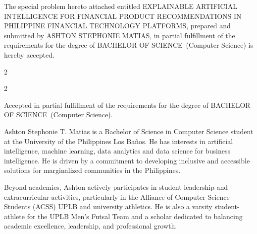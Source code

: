 \documentclass{icsthesis}
\renewcommand{\TITLE}{EXPLAINABLE ARTIFICIAL INTELLIGENCE FOR FINANCIAL PRODUCT RECOMMENDATIONS IN PHILIPPINE FINANCIAL TECHNOLOGY PLATFORMS}
\renewcommand{\AUTHOR}{ASHTON STEPHONIE MATIAS}
\renewcommand{\DEGREE}{BACHELOR OF SCIENCE}
\renewcommand{\MAJOR}{Computer Science}
\begin{document}
	
	\begin{frontmatter}
		\maketitle
				
		\begin{approvalpage}
			The special problem hereto attached entitled \TITLE , prepared and submitted by \AUTHOR , in partial fulfillment of the requirements for the degree of \DEGREE\ (\MAJOR) is hereby accepted.
			
			\begin{multicols}{2}
				\centering
				\columnbreak
			\end{multicols}
            \begin{multicols}{2}
				\centering
				\columnbreak
				\addsignature{RACHEL EDITA O. ROXAS}{Adviser}
			\end{multicols}
			
			Accepted in partial fulfillment of the requirements for the degree of \DEGREE\ (\MAJOR). 
		\end{approvalpage}
		
		\begin{biosketch}
			Ashton Stephonie T. Matias is a Bachelor of Science in Computer Science student at the University of the Philippines Los Ba\~{n}os. He has interests in artificial intelligence, machine learning, data analytics and data science for business intelligence. He is driven by a commitment to developing inclusive and accessible solutions for marginalized communities in the Philippines.

            Beyond academics, Ashton actively participates in student leadership and extracurricular activities, particularly in the Alliance of Computer Science Students (ACSS) UPLB and university athletics. He is also a varsity student-athlete for the UPLB Men's Futsal Team and a scholar dedicated to balancing academic excellence, leadership, and professional growth.
			

\end{biosketch}
\end{frontmatter}
\end{document}
